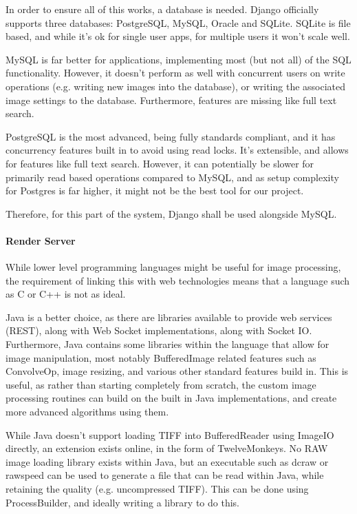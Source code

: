 \documentclass[12pt,a4paper]{article}
\begin{document}
In order to ensure all of this works, a database is needed. Django officially supports three databases:
PostgreSQL, MySQL, Oracle and SQLite. SQLite is file based, and while it's ok for single user apps, for
multiple users it won't scale well.

MySQL is far better for applications, implementing most (but not all) of the SQL functionality. However,
it doesn't perform as well with concurrent users on write operations (e.g. writing new images into the database),
or writing the associated image settings to the database. Furthermore, features are missing like full text search.

 PostgreSQL is the most advanced, being fully standards compliant, and it has concurrency features built in to avoid using read locks.
 It's extensible, and allows for features like full text search. However, it can potentially be slower for primarily read based operations
 compared to MySQL, and as setup complexity for Postgres is far higher, it might not be the best tool for our project. \cite{ComparisonOfDatabaseBackends}

 Therefore, for this part of the system, Django shall be used alongside MySQL.
\paragraph{Render Server}
While lower level programming languages might be useful for image processing,
the requirement of linking this with web technologies means that a language such as C
or C++ is not as ideal.

Java is a better choice, as there are libraries available to provide web services (REST),
along with Web Socket implementations, along with Socket IO. Furthermore, Java contains
some libraries within the language that allow for image manipulation, most notably
BufferedImage related features such as ConvolveOp, image resizing, and various other standard
features build in. This is useful, as rather than starting completely from scratch, the custom
image processing routines can build on the built in Java implementations, and create more advanced
algorithms using them.

While Java doesn't support loading TIFF into BufferedReader using ImageIO directly,
an extension exists online, in the form of TwelveMonkeys. No RAW image loading library
exists within Java, but an executable such as dcraw or rawspeed can be used to generate a file
that can be read within Java, while retaining the quality (e.g. uncompressed TIFF). This can be done
using ProcessBuilder, and ideally writing a library to do this.
\end{document}
